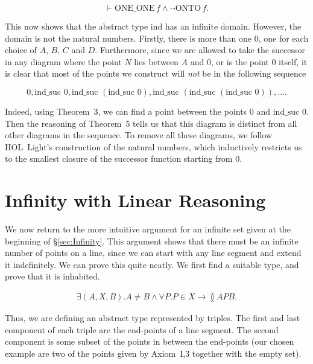 \begin{displaymath}
\vdash \text{ONE\_ONE}\,f \wedge \neg\text{ONTO}\,f.
\end{displaymath}

This now shows that the abstract type $\text{ind}$ has an infinite domain. However, the domain is not the natural numbers. Firstly, there is more than one $0$, one for each choice of $A$, $B$, $C$ and $D$. Furthermore, since we are allowed to take the successor in any diagram where the point $N$ lies between $A$ and $0$, or is the point $0$ itself, it is clear that most of the points we construct will \emph{not} be in the following sequence

\begin{displaymath}
0, \text{ind\_suc } 0, \text{ind\_suc }(\text{ind\_suc } 0), \text{ind\_suc }(\text{ind\_suc }(\text{ind\_suc } 0)),  \ldots.
\end{displaymath}

Indeed, using Theorem~3, we can find a point between the points $0$ and $\text{ind\_suc } 0$. Then the reasoning of Theorem~5 tells us that this diagram is distinct from all other diagrams in the sequence. To remove all these diagrams, we follow HOL~Light's construction of the natural numbers, which inductively restricts us to the smallest closure of the successor function starting from $0$.

\section{Infinity with Linear Reasoning}
We now return to the more intuitive argument for an infinite set given at the beginning of \S\ref{sec:Infinity}. This argument shows that there must be an infinite number of points on a line, since we can start with any line segment and extend it indefinitely. We can prove this quite neatly. We first find a suitable type, and prove that it is inhabited.

\begin{align*}
\exists (A,X,B). A \neq B \wedge \forall P. P \in X \rightarrow \between{A}{P}{B}.
\end{align*}

Thus, we are defining an abstract type represented by triples. The first and last component of each triple are the end-points of a line segment. The second component is some subset of the points in between the end-points (our chosen example are two of the points given by Axiom~I,3 together with the empty set).

